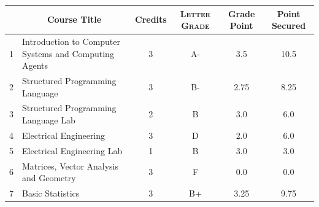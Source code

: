 \documentclass[11pt]{article}
\newcommand*{\numtwo}[1]{\pgfmathprintnumber[
                    fixed, precision=2, fixed zerofill=true]{#1}}
\begin{document}
                \begin{center}
                    \renewcommand{\arraystretch}{1.08}
                    
                \begin{tabular}{|c|l|c|>{\scshape}c|c|c|}
                \hline  \rule[-1ex]{0pt}{3.5ex} {\centering{\bf Course Code}} &  \multicolumn{1}{c|}{\textbf{Course Title}}  & {\bf Credits} & {\bf Letter Grade} & {\bf Grade Point} & {\bf Point Secured}  \\ 
                \hline   1 &  Introduction to Computer Systems and Computing Agents		 & 3 & A- & 3.5 & 10.5 \\ %
                \hline   2 &  Structured Programming Language		 & 3 & B- & 2.75 & 8.25 \\ %
                \hline   3 &  Structured Programming Language Lab		 & 2 & B & 3.0 & 6.0 \\ %
                \hline   4 &  Electrical Engineering		 & 3 & D & 2.0 & 6.0 \\ %
                \hline   5 &  Electrical Engineering Lab		 & 1 & B & 3.0 & 3.0 \\ %
                \hline   6 &  Matrices, Vector Analysis and Geometry		 & 3 & F & 0.0 & 0.0 \\ %
                \hline   7 &  Basic Statistics		 & 3 & B+ & 3.25 & 9.75 \\ %

\hline                %
                \end{tabular}
                \end{center}
                \renewcommand{\arraystretch}{1.03}
\end{document}
